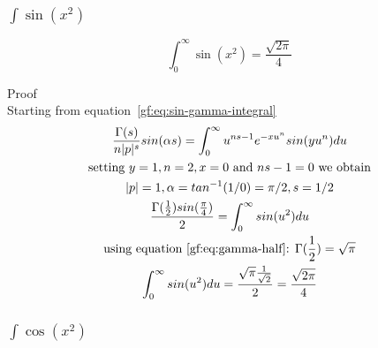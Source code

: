 \documentclass[a4paper]{article}
\begin{document}
    \subsubsection{\texorpdfstring{$\int \sin(x^2)$}{Integral of sin(x^2)}}

    \begin{theorem}
        \begin{equation}
            \boxed{
                \int_{0}^{\infty} \sin(x^2) = \frac{\sqrt{2\pi}}{4}
            }\label{gf:eq:equation19}
        \end{equation}

        Proof
        \\
        Starting from equation~\ref{gf:eq:sin-gamma-integral}
        \begin{gather*}
            \frac{\Gamma(s)}{n |p|^s} sin(\alpha s)= \int_{0}^{\infty} u^{ns -1} e^{-x u^{n}} sin(y u^n) du
            \\
            \text{setting $y=1, n=2, x=0$ and $ns -1 = 0$ we obtain}
            \\
            |p| = 1, \alpha = tan^{-1}(1/0) = \pi/2, s = 1/2
            \\
            \frac{\Gamma(\frac{1}{2}) sin(\frac{\pi}{4})}{2} = \int_{0}^{\infty} sin(u^2) du
            \\
            \text{using equation~\ref{gf:eq:gamma-half}: } \Gamma(\frac{1}{2}) = \sqrt{\pi}
            \\
            \int_{0}^{\infty} sin(u^2) du = \frac{\sqrt{\pi} \frac{1}{\sqrt{2}}}{2}
            = \frac{\sqrt{2\pi}}{4}
        \end{gather*}
    \end{theorem}

    \subsubsection{\texorpdfstring{$\int \cos(x^2)$}{Integral of cos(x^2)}}
\end{document}
